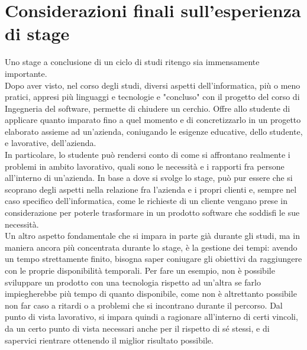 \section{Considerazioni finali sull'esperienza di stage}
\label{sec:considerazioni-finali}

Uno stage a conclusione di un ciclo di studi ritengo sia immensamente importante.\\
Dopo aver visto, nel corso degli studi, diversi aspetti dell'informatica, più o meno pratici, appresi più linguaggi e tecnologie e "concluso" con il progetto del corso di Ingegneria del software, permette di chiudere un cerchio.
Offre allo studente di applicare quanto imparato fino a quel momento e di concretizzarlo in un progetto elaborato assieme ad un'azienda, coniugando le esigenze educative, dello studente, e lavorative, dell'azienda.\\
In particolare, lo studente può rendersi conto di come si affrontano realmente i problemi in ambito lavorativo, quali sono le necessità e i rapporti fra persone all'interno di un'azienda.
In base a dove si svolge lo stage, può pur essere che si scoprano degli aspetti nella relazione fra l'azienda e i propri clienti e, sempre nel caso specifico dell'informatica, come le richieste di un cliente vengano prese in considerazione per poterle trasformare in un prodotto software che soddisfi le sue necessità.\\
Un altro aspetto fondamentale che si impara in parte già durante gli studi, ma in maniera ancora più concentrata durante lo stage, è la gestione dei tempi: avendo un tempo strettamente finito, bisogna saper coniugare gli obiettivi da raggiungere con le proprie disponibilità temporali.
Per fare un esempio, non è possibile sviluppare un prodotto con una tecnologia rispetto ad un'altra se farlo impiegherebbe più tempo di quanto disponibile, come non è altrettanto possibile non far caso a ritardi o a problemi che si incontrano durante il percorso.
Dal punto di vista lavorativo, si impara quindi a ragionare all'interno di certi vincoli, da un certo punto di vista necessari anche per il rispetto di sé stessi, e di sapervici rientrare ottenendo il miglior risultato possibile.